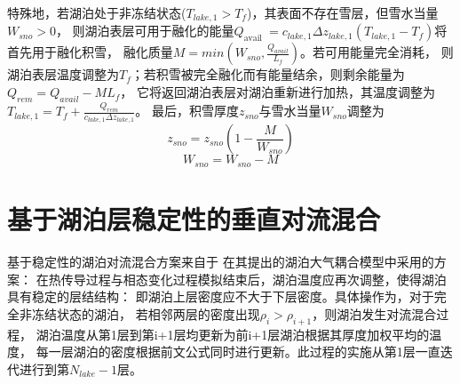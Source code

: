 特殊地，若湖泊处于非冻结状态($T_{lake,1}>T_f$)，其表面不存在雪层，但雪水当量$W_{sno}>0$，
则湖泊表层可用于融化的能量$Q_{\text {avail }}=c_{lake, 1} \Delta z_{lake, 1}\left(T_{lake, 1}-T_{f}\right)$将首先用于融化积雪，
融化质量$M=min{\left(W_{sno},\frac{Q_{avail}}{L_f}\right)}$。若可用能量完全消耗，
则湖泊表层温度调整为$T_f$；若积雪被完全融化而有能量结余，则剩余能量为$Q_{rem}=Q_{avail}-ML_f$，
它将返回湖泊表层对湖泊重新进行加热，其温度调整为$T_{lake, 1}=T_{f}+\frac{Q_{rem}}{c_{lake, 1} \Delta z_{lake, 1}}$。
最后，积雪厚度$z_{sno}$与雪水当量$W_{sno}$调整为
\begin{equation}
z_{sno}=z_{sno}\left(1-\frac{M}{W_{sno}}\right)
\end{equation}
\begin{equation}
W_{sno}=W_{sno}-M
\end{equation}

\section{基于湖泊层稳定性的垂直对流混合}
基于稳定性的湖泊对流混合方案来自于\citet{hostetler1993interactive,hostetler1994lake} 在其提出的湖泊大气耦合模型中采用的方案：
在热传导过程与相态变化过程模拟结束后，湖泊温度应再次调整，使得湖泊具有稳定的层结结构：
即湖泊上层密度应不大于下层密度。具体操作为，对于完全非冻结状态的湖泊，
若相邻两层的密度出现$\rho_i>\rho_{i+1}$，则湖泊发生对流混合过程，
湖泊温度从第1层到第i+1层均更新为前i+1层湖泊根据其厚度加权平均的温度，
每一层湖泊的密度根据前文公式同时进行更新。此过程的实施从第1层一直迭代进行到第$N_{lake}-1$层。

